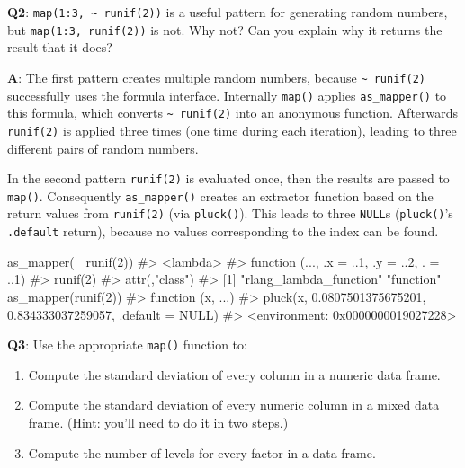 \documentclass[
]{krantz}
\makeatletter
\newenvironment{Shaded}{\begin{snugshade}}{\end{snugshade}}
\newcommand{\CommentTok}[1]{\textcolor[rgb]{0.56,0.35,0.01}{\textit{#1}}}
\newcommand{\DecValTok}[1]{\textcolor[rgb]{0.00,0.00,0.81}{#1}}
\newcommand{\KeywordTok}[1]{\textcolor[rgb]{0.13,0.29,0.53}{\textbf{#1}}}
\newcommand{\NormalTok}[1]{#1}
\newcommand{\OperatorTok}[1]{\textcolor[rgb]{0.81,0.36,0.00}{\textbf{#1}}}
\newcommand{\StringTok}[1]{\textcolor[rgb]{0.31,0.60,0.02}{#1}}
\newenvironment{kframe}{%
\medskip{}
\setlength{\fboxsep}{.8em}
 \def\at@end@of@kframe{}%
 \ifinner\ifhmode%
  \def\at@end@of@kframe{\end{minipage}}%
  \begin{minipage}{\columnwidth}%
 \fi\fi%
 \def\FrameCommand##1{\hskip\@totalleftmargin \hskip-\fboxsep
 \colorbox{shadecolor}{##1}\hskip-\fboxsep
     \hskip-\linewidth \hskip-\@totalleftmargin \hskip\columnwidth}%
 \MakeFramed {\advance\hsize-\width
   \@totalleftmargin\z@ \linewidth\hsize
   \@setminipage}}%
 {\par\unskip\endMakeFramed%
 \at@end@of@kframe}
\renewenvironment{Shaded}{\begin{kframe}}{\end{kframe}}
\renewcommand{\KeywordTok} [1]{\textcolor[rgb]{0.00,0.44,0.13}{{#1}}}
\renewcommand{\DecValTok}  [1]{\textcolor[rgb]{0.25,0.63,0.44}{{#1}}}
\renewcommand{\StringTok}  [1]{\textcolor[rgb]{0.25,0.44,0.63}{{#1}}}
\renewcommand{\CommentTok} [1]{\textcolor[rgb]{0.38,0.63,0.69}{{#1}}}
\renewcommand{\NormalTok}  [1]{{#1}}
\makeatother
\begin{document}
\textbf{{Q2}}: \texttt{map(1:3,\ \textasciitilde{}\ runif(2))} is a useful pattern for generating random numbers, but \texttt{map(1:3,\ runif(2))} is not. Why not? Can you explain why it returns the result that it does?

\textbf{{A}}: The first pattern creates multiple random numbers, because \texttt{\textasciitilde{}\ runif(2)} successfully uses the formula interface. Internally \texttt{map()} applies \texttt{as\_mapper()} to this formula, which converts \texttt{\textasciitilde{}\ runif(2)} into an anonymous function. Afterwards \texttt{runif(2)} is applied three times (one time during each iteration), leading to three different pairs of random numbers.

In the second pattern \texttt{runif(2)} is evaluated once, then the results are passed to \texttt{map()}. Consequently \texttt{as\_mapper()} creates an extractor function based on the return values from \texttt{runif(2)} (via \texttt{pluck()}). This leads to three \texttt{NULL}s (\texttt{pluck()}'s \texttt{.default} return), because no values corresponding to the index can be found.

\begin{Shaded}
\begin{Highlighting}[]
\KeywordTok{as_mapper}\NormalTok{(}\OperatorTok{~}\StringTok{ }\KeywordTok{runif}\NormalTok{(}\DecValTok{2}\NormalTok{))}
\CommentTok{#> <lambda>}
\CommentTok{#> function (..., .x = ..1, .y = ..2, . = ..1) }
\CommentTok{#> runif(2)}
\CommentTok{#> attr(,"class")}
\CommentTok{#> [1] "rlang_lambda_function" "function"}
\KeywordTok{as_mapper}\NormalTok{(}\KeywordTok{runif}\NormalTok{(}\DecValTok{2}\NormalTok{))}
\CommentTok{#> function (x, ...) }
\CommentTok{#> pluck(x, 0.0807501375675201, 0.834333037259057, .default = NULL)}
\CommentTok{#> <environment: 0x0000000019027228>}
\end{Highlighting}
\end{Shaded}

\textbf{{Q3}}: Use the appropriate \texttt{map()} function to:

\begin{enumerate}
\def\labelenumi{\alph{enumi})}
\item
  Compute the standard deviation of every column in a numeric data frame.
\item
  Compute the standard deviation of every numeric column in a mixed data frame. (Hint: you'll need to do it in two steps.)
\item
  Compute the number of levels for every factor in a data frame.
\end{enumerate}
\end{document}
